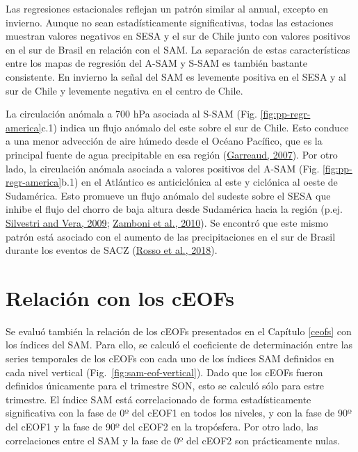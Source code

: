 \documentclass[12pt,oneside,a4paper]{reedthesis}
\begin{document}
Las regresiones estacionales reflejan un patrón similar al annual, excepto en invierno.
Aunque no sean estadísticamente significativas, todas las estaciones muestran valores negativos en SESA y el sur de Chile junto con valores positivos en el sur de Brasil en relación con el SAM.
La separación de estas características entre los mapas de regresión del A-SAM y S-SAM es también bastante consistente.
En invierno la señal del SAM es levemente positiva en el SESA y al sur de Chile y levemente negativa en el centro de Chile.

La circulación anómala a 700 hPa asociada al S-SAM (Fig. \ref{fig:pp-regr-america}c.1) indica un flujo anómalo del este sobre el sur de Chile.
Esto conduce a una menor advección de aire húmedo desde el Océano Pacífico, que es la principal fuente de agua precipitable en esa región (\protect\hyperlink{ref-garreaud2007}{Garreaud, 2007}).
Por otro lado, la circulación anómala asociada a valores positivos del A-SAM (Fig. \ref{fig:pp-regr-america}b.1) en el Atlántico es anticiclónica al este y ciclónica al oeste de Sudamérica.
Esto promueve un flujo anómalo del sudeste sobre el SESA que inhibe el flujo del chorro de baja altura desde Sudamérica hacia la región (p.ej. \protect\hyperlink{ref-silvestri2009}{Silvestri and Vera, 2009}; \protect\hyperlink{ref-zamboni2010}{Zamboni et al., 2010}).
Se encontró que este mismo patrón está asociado con el aumento de las precipitaciones en el sur de Brasil durante los eventos de SACZ (\protect\hyperlink{ref-rosso2018}{Rosso et al., 2018}).

\hypertarget{sam-ceof}{%
\section{Relación con los cEOFs}\label{sam-ceof}}

Se evaluó también la relación de los cEOFs presentados en el Capítulo \ref{ceofs} con los índices del SAM.
Para ello, se calculó el coeficiente de determinación entre las series temporales de los cEOFs con cada uno de los índices SAM definidos en cada nivel vertical (Fig.~\ref{fig:sam-eof-vertical}).
Dado que los cEOFs fueron definidos únicamente para el trimestre SON, esto se calculó sólo para estre trimestre.
El índice SAM está correlacionado de forma estadísticamente significativa con la fase de 0º del cEOF1 en todos los niveles, y con la fase de 90º del cEOF1 y la fase de 90º del cEOF2 en la tropósfera.
Por otro lado, las correlaciones entre el SAM y la fase de 0º del cEOF2 son prácticamente nulas.
\end{document}
